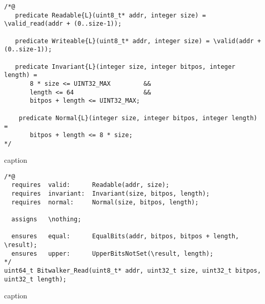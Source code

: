 \begin{listing}[hbt]
\begin{minipage}{0.99\textwidth}
\begin{lstlisting}[style=acsl-block]
/*@
   predicate Readable{L}(uint8_t* addr, integer size) = \valid_read(addr + (0..size-1));

   predicate Writeable{L}(uint8_t* addr, integer size) = \valid(addr + (0..size-1));

   predicate Invariant{L}(integer size, integer bitpos, integer length) =
       8 * size <= UINT32_MAX         &&
       length <= 64                   &&
       bitpos + length <= UINT32_MAX;

    predicate Normal{L}(integer size, integer bitpos, integer length) =
       bitpos + length <= 8 * size;
*/
\end{lstlisting}
\end{minipage}
\caption{caption}
\end{listing}



\begin{listing}[hbt]
\begin{minipage}{0.99\textwidth}
\begin{lstlisting}[style=acsl-block]
/*@
  requires  valid:      Readable(addr, size);
  requires  invariant:  Invariant(size, bitpos, length);
  requires  normal:     Normal(size, bitpos, length);

  assigns   \nothing;

  ensures   equal:      EqualBits(addr, bitpos, bitpos + length, \result);
  ensures   upper:      UpperBitsNotSet(\result, length);
*/
uint64_t Bitwalker_Read(uint8_t* addr, uint32_t size, uint32_t bitpos, uint32_t length);
\end{lstlisting}
\end{minipage}
\caption{caption}
\end{listing}



